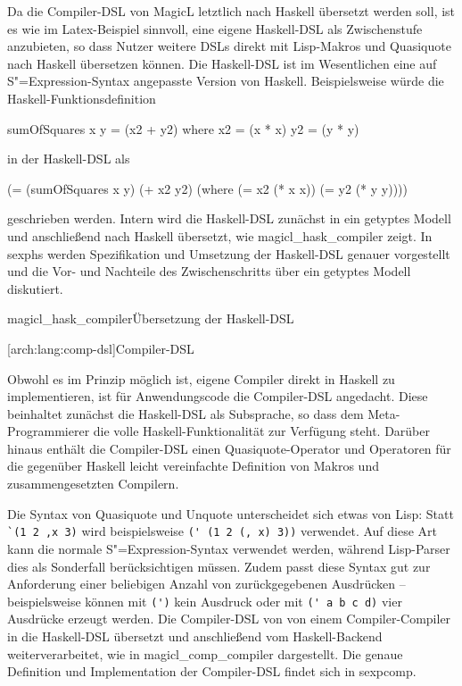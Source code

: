 \documentclass[12pt, a4paper, bibgerm]{scrbook}
\newenvironment{DIFnomarkup}{}{}
\newcommand\icode[1]{\lstinline?#1?}
\newcommand\lsubsection{}
\newcommand\cref{}
\newcommand\abb{}
\newcommand\fig{}
\newcommand{\sexp}{S"=Expression}
\begin{document}
Da die Compiler-DSL von MagicL letztlich nach Haskell übersetzt werden
soll, ist es wie im Latex-Beispiel sinnvoll, eine eigene Haskell-DSL als
Zwischenstufe anzubieten, so dass Nutzer weitere DSLs direkt mit
Lisp-Makros und Quasiquote nach Haskell übersetzen können. Die
Haskell-DSL ist im Wesentlichen eine auf \sexp{}-Syntax angepasste
Version von Haskell. Beispielsweise würde die
Haskell-Funktionsdefinition
\begin{DIFnomarkup}
\begin{code}
sumOfSquares x y = (x2 + y2)
  where
    x2 = (x * x)            
    y2 = (y * y)
\end{code}
\end{DIFnomarkup}
in der Haskell-DSL als
\begin{DIFnomarkup}
\begin{code}
(= (sumOfSquares x y)
   (+ x2 y2)
  (where
    (= x2 (* x x))
    (= y2 (* y y))))
\end{code}
\end{DIFnomarkup}
geschrieben werden. Intern wird die Haskell-DSL zunächst in ein getyptes
Modell und anschließend nach Haskell übersetzt, wie
\abb{magicl_hask_compiler} zeigt. In \cref{sexphs} werden Spezifikation und Umsetzung
der Haskell-DSL genauer vorgestellt und die Vor- und Nachteile des
Zwischenschritts über ein getyptes Modell diskutiert.

\fig{magicl_hask_compiler}{Übersetzung der Haskell-DSL}

\lsubsection[arch:lang:comp-dsl]{Compiler-DSL}

Obwohl es im Prinzip möglich ist, eigene Compiler direkt in Haskell zu
implementieren, ist für Anwendungscode die Compiler-DSL angedacht. Diese
beinhaltet zunächst die Haskell-DSL als Subsprache, so dass dem
Meta-Programmierer die volle Haskell-Funktionalität zur Verfügung steht.
Darüber hinaus enthält die Compiler-DSL einen Quasiquote-Operator und
Operatoren für die gegenüber Haskell leicht vereinfachte Definition von
Makros und zusammengesetzten Compilern.

Die Syntax von Quasiquote und Unquote unterscheidet sich etwas von Lisp:
Statt \icode{`(1 2 ,x 3)} wird beispielsweise \icode{(' (1 2 (, x) 3))}
verwendet. Auf diese Art kann die normale \sexp{}-Syntax verwendet
werden, während Lisp-Parser dies als Sonderfall berücksichtigen
müssen. Zudem passt diese Syntax gut zur Anforderung einer beliebigen
Anzahl von zurückgegebenen Ausdrücken -- beispielsweise können mit
\icode{(')} kein Ausdruck oder mit \icode{(' a b c d)} vier Ausdrücke
erzeugt werden. Die Compiler-DSL von von einem Compiler-Compiler in die
Haskell-DSL übersetzt und anschließend vom Haskell-Backend
weiterverarbeitet, wie in \abb{magicl_comp_compiler} dargestellt. Die
genaue Definition und Implementation der Compiler-DSL findet sich in
\cref{sexpcomp}.
\end{document}
